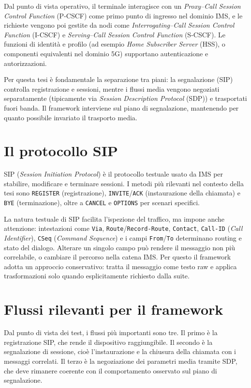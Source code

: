 Dal punto di vista operativo, il terminale interagisce con un \emph{Proxy--Call Session Control Function} (P-CSCF) come primo punto di ingresso nel dominio IMS, e le richieste vengono poi gestite da nodi come \emph{Interrogating--Call Session Control Function} (I-CSCF) e \emph{Serving--Call Session Control Function} (S-CSCF). Le funzioni di identit\`a e profilo (ad esempio \emph{Home Subscriber Server} (HSS), o componenti equivalenti nel dominio 5G) supportano autenticazione e autorizzazioni.

Per questa tesi \`e fondamentale la separazione tra piani: la segnalazione (SIP) controlla registrazione e sessioni, mentre i flussi media vengono negoziati separatamente (tipicamente via \emph{Session Description Protocol} (SDP)) e trasportati fuori banda. Il framework interviene sul piano di segnalazione, mantenendo per quanto possibile invariato il trasporto media.

\section{Il protocollo SIP}
SIP (\emph{Session Initiation Protocol}) \`e il protocollo testuale usato da IMS per stabilire, modificare e terminare sessioni. I metodi pi\`u rilevanti nel contesto della tesi sono \texttt{REGISTER} (registrazione), \texttt{INVITE}/\texttt{ACK} (instaurazione della chiamata) e \texttt{BYE} (terminazione), oltre a \texttt{CANCEL} e \texttt{OPTIONS} per scenari specifici.

La natura testuale di SIP facilita l'ispezione del traffico, ma impone anche attenzione: intestazioni come \texttt{Via}, \texttt{Route}/\texttt{Record-Route}, \texttt{Contact}, \texttt{Call-ID} (\emph{Call Identifier}), \texttt{CSeq} (\emph{Command Sequence}) e i campi \texttt{From}/\texttt{To} determinano routing e stato del dialogo. Alterare un singolo campo pu\`o rendere il messaggio non pi\`u correlabile, o cambiare il percorso nella catena IMS. Per questo il framework adotta un approccio conservativo: tratta il messaggio come testo raw e applica trasformazioni solo quando esplicitamente richiesto dalla suite.

\section{Flussi rilevanti per il framework}
Dal punto di vista dei test, i flussi pi\`u importanti sono tre. Il primo \`e la registrazione SIP, che rende il dispositivo raggiungibile. Il secondo \`e la segnalazione di sessione, cio\`e l'instaurazione e la chiusura della chiamata con i messaggi correlati. Il terzo \`e la negoziazione dei parametri media tramite SDP, che deve rimanere coerente con il comportamento osservato sul piano di segnalazione.

